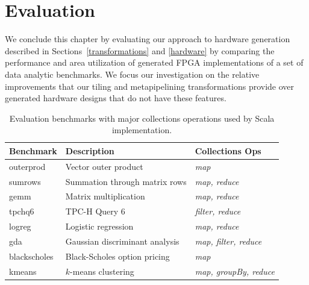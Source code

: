 \section{Evaluation}
\label{evaluation}



We conclude this chapter by evaluating our approach to hardware generation
described in Sections~\ref{transformations} and \ref{hardware} by comparing the performance and
area utilization of generated FPGA implementations of a set of data analytic benchmarks.
We focus our investigation on the relative improvements that our tiling and metapipelining transformations
provide over generated hardware designs that do not have these features.

\begin{table}
\centering\footnotesize
\hspace{-0.022\textwidth}\begin{tabular}{lll}
\toprule

{\bf Benchmark} & {\bf Description} & {\bf Collections Ops}\\ \midrule
outerprod & Vector outer product & \emph{map}\\ \midrule
sumrows & Summation through matrix rows & \emph{map, reduce}\\ \midrule
gemm & Matrix multiplication & \emph{map, reduce}\\ \midrule
tpchq6 & TPC-H Query 6 & \emph{filter, reduce}\\ \midrule
logreg & Logistic regression & \emph{map, reduce}\\ \midrule
gda & Gaussian discriminant analysis & \emph{map, filter, reduce}\\ \midrule
blackscholes & Black-Scholes option pricing & \emph{map}\\ \midrule
kmeans & $k$-means clustering & \emph{map, groupBy, reduce}\\ \bottomrule
\end{tabular}

\caption{Evaluation benchmarks with major collections operations used by
Scala implementation.}
\label{table:benchmarks}
\end{table}

